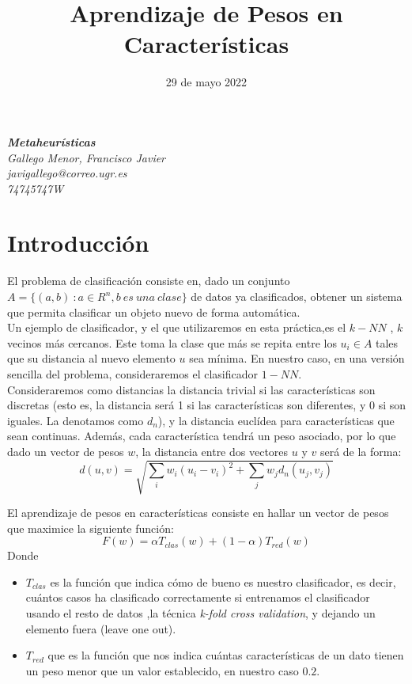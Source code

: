 \documentclass[10pt, a4paper]{article}
\title{\vspace{3cm}\textcolor{ugrColor}{\textbf{{{{\Huge Aprendizaje de Pesos en Características}}}}}}
\date{29 de mayo 2022}
\theoremstyle{theorem-style}
\theoremstyle{theorem-style}
\theoremstyle{theorem2-style}
\theoremstyle{definition-style}
\theoremstyle{remark-style}
\theoremstyle{example-style}
\theoremstyle{definition-style}
\theoremstyle{remark-style}
\theoremstyle{remark-style}
\begin{document}
\maketitle

\begin{center}
\large
\vspace{2cm}
\textbf{\emph{\Large Metaheurísticas}}\\
\emph{\large Gallego Menor, Francisco Javier}\\
\emph{\large javigallego@correo.ugr.es}\\
\emph{\large 74745747W}\\

\end{center}
              
\newpage


\tableofcontents
\newpage

\section{Introducción}
El problema de clasificación consiste en, dado un conjunto $A=\{(a,b) \ : a \in R^n, b \ es \ una \ clase\}$ de datos ya clasificados, obtener un sistema que permita clasificar un objeto nuevo de forma automática.\\

 Un ejemplo de clasificador, y el que utilizaremos en esta práctica,es el $k-NN$ , $k$ vecinos más cercanos. Este toma la clase que más se repita entre los $u_i\in A$ tales que su distancia al nuevo elemento $u$ sea mínima. En nuestro caso, en una versión sencilla del problema, consideraremos el clasificador $1-NN$. \\

Consideraremos como distancias la distancia trivial si las características son discretas (esto es, la distancia será 1 si las características son diferentes, y 0 si son iguales. La denotamos como $d_n$), y la distancia euclídea para características que sean continuas. Además, cada característica tendrá un peso asociado, por lo que dado un vector de pesos $w$, la distancia entre dos vectores $u$ y $v$ será de la forma:
\[
d(u,v) = \sqrt {\sum_i w_i(u_i- v_i)^2 + \sum_j w_j d_n(u_j,v_j)}
\]

 El aprendizaje de pesos en características consiste  en hallar un vector de pesos que maximice la siguiente función:
\[
F(w) = \alpha T_{clas}(w) + (1-\alpha)T_{red}(w)
\]
Donde
\begin{itemize}
\item $T_{clas}$ es la función que indica cómo de bueno es nuestro clasificador, es decir, cuántos casos ha clasificado correctamente si entrenamos el clasificador usando el resto de datos ,la técnica \emph{k-fold cross validation}, y dejando un elemento fuera (leave one out).
	\item $T_{red}$ que es la función que nos indica cuántas características de un dato tienen un peso menor que un valor establecido, en nuestro caso $0.2$.
\end{itemize}
\end{document}
